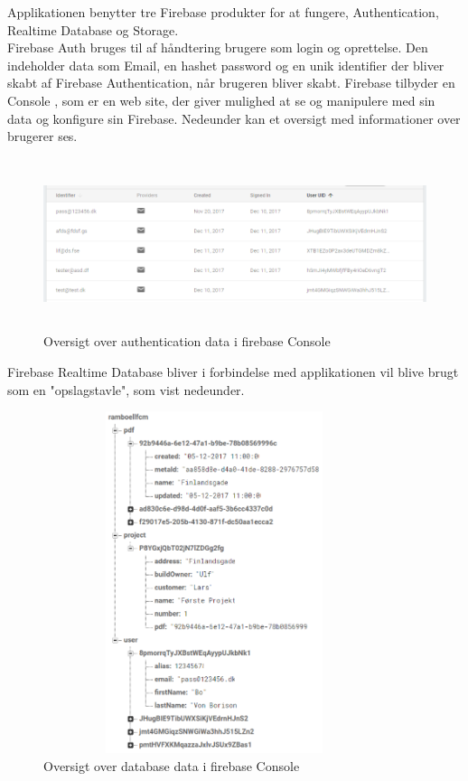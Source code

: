 Applikationen benytter tre Firebase produkter for at fungere, Authentication, Realtime Database og Storage.\\

 Firebase Auth\cite{FirebaseAuth} bruges til af håndtering brugere som login og oprettelse. Den indeholder data som Email, en hashet password og en unik identifier der bliver skabt af Firebase Authentication, når brugeren bliver skabt. Firebase tilbyder en Console , som er en web site, der giver mulighed at se og manipulere med sin data og konfigure sin Firebase.  Nedeunder kan et oversigt med informationer over brugerer ses. 
\begin{figure}[H] %
	\centering
	\includegraphics[height=5cm, width=15cm]{../ArkitekturDesign/Design/Firebase/FirebaseAuth.PNG}
	\caption{Oversigt over authentication data i firebase Console}
	\label{fig:FirebaseAuthPNG}
\end{figure}

Firebase Realtime Database bliver i forbindelse med applikationen vil blive brugt som en "opslagstavle", som vist nedeunder.  
 
\begin{figure}[H] %
	\centering
	\includegraphics[height=10cm, width=10cm]{../ArkitekturDesign/Design/Firebase/FirebaseDB.PNG}
	\caption{Oversigt over database data i firebase Console}
	\label{fig:FirebaseDBPNG}
\end{figure}

